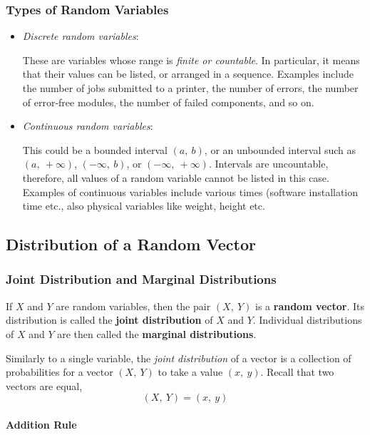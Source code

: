 \begin{multicols}{2}
\subsubsection{Types of Random Variables}

\begin{itemize}
  \item \textit{Discrete random variables}:
    
    These are variables whose range is \textit{finite or countable}. In particular, it means that their values can be listed, or arranged in a sequence. Examples include the number of jobs submitted to a printer, the number of errors, the number of error-free modules, the number of failed components, and so on.

  \item \textit{Continuous random variables}:
  
    This could be a bounded interval $(a,\ b)$, or an unbounded interval such as $(a,\ +\infty)$, $(-\infty,\ b)$, or $(-\infty,\ +\infty)$. Intervals are uncountable, therefore, all values of a random variable cannot be listed in this case. Examples of continuous variables include various times (software installation time etc., also physical variables like weight, height etc.
\end{itemize}


\subsection{Distribution of a Random Vector}

\subsubsection{Joint Distribution and Marginal Distributions}

If $X$ and $Y$ are random variables, then the pair $(X,\ Y)$ is a \textbf{random vector}. Its distribution is called the \textbf{joint distribution} of $X$ and $Y$. Individual distributions of $X$ and $Y$ are then called the \textbf{marginal distributions}.

Similarly to a single variable, the \textit{joint distribution} of a vector is a collection of probabilities for a vector $(X,\ Y)$ to take a value $(x,\ y)$. Recall that two vectors are equal,
\begin{equation*}
    (X,\ Y) = (x,\ y)
\end{equation*}

\paragraph*{Addition Rule}


\end{multicols}
